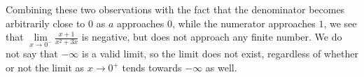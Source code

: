 \documentclass{ximera}
\begin{document}
\begin{exercise}
\begin{hint}
     Combining these two observations with the fact that the denominator becomes arbitrarily close to $0$ as $a$ approaches $0$, while the numerator approaches $1$, we see that $\lim\limits_{x\to0^{-}}\frac{x+1}{x^2+3x}$ is negative, but does not approach any finite number. We do not say that $-\infty$ is a valid limit, so the limit does not exist, regardless of whether or not the limit as $x\to0^{+}$ tends towards $-\infty$ as well.
     \end{hint}
\end{exercise}
\end{document}
